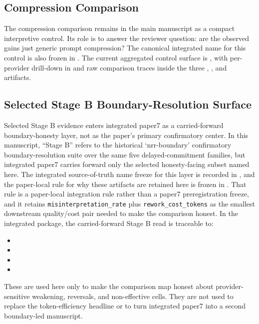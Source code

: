 \documentclass[11pt,a4paper]{article}
\begin{document}
\subsection{Compression Comparison}

The compression comparison remains in the main manuscript as a compact interpretive control. Its role is to answer the reviewer question: are the observed gains just generic prompt compression? The canonical integrated name for this control is also frozen in . The current aggregated control surface is , with per-provider drill-down in  and raw comparison traces inside the three , , and  artifacts.

\subsection{Selected Stage B Boundary-Resolution Surface}

Selected Stage B evidence enters integrated paper7 as a carried-forward boundary-honesty layer, not as the paper's primary confirmatory center. In this manuscript, ``Stage B'' refers to the historical `nrr-boundary' confirmatory boundary-resolution suite over the same five delayed-commitment families, but integrated paper7 carries forward only the selected honesty-facing subset named here. The integrated source-of-truth name freeze for this layer is recorded in , and the paper-local rule for why these artifacts are retained here is frozen in . That rule is a paper-local integration rule rather than a paper7 preregistration freeze, and it retains \texttt{misinterpretation\_rate} plus \texttt{rework\_cost\_tokens} as the smallest downstream quality/cost pair needed to make the comparison honest. In the integrated package, the carried-forward Stage B read is traceable to:
\begin{itemize}
  \item {}
  \item {}
  \item {}
  \item {}
\end{itemize}
These are used here only to make the comparison map honest about provider-sensitive weakening, reversals, and non-effective cells. They are not used to replace the token-efficiency headline or to turn integrated paper7 into a second boundary-led manuscript.
\end{document}
